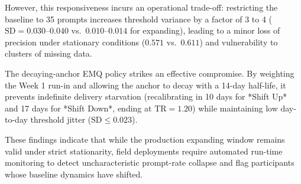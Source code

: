 \documentclass[11pt,letterpaper]{article}
\begin{document}
However, this responsiveness incurs an operational trade-off: restricting the baseline to 35 prompts increases threshold variance by a factor of 3 to 4 ($\text{SD} = 0.030$--$0.040$ vs.\ $0.010$--$0.014$ for expanding), leading to a minor loss of precision under stationary conditions ($0.571$ vs.\ $0.611$) and vulnerability to clusters of missing data.

The decaying-anchor EMQ policy strikes an effective compromise. By weighting the Week 1 run-in and allowing the anchor to decay with a 14-day half-life, it prevents indefinite delivery starvation (recalibrating in 10 days for *Shift Up* and 17 days for *Shift Down*, ending at $\text{TR} = 1.20$) while maintaining low day-to-day threshold jitter ($\text{SD} \le 0.023$). 

These findings indicate that while the production expanding window remains valid under strict stationarity, field deployments require automated run-time monitoring to detect uncharacteristic prompt-rate collapse and flag participants whose baseline dynamics have shifted.
\end{document}

